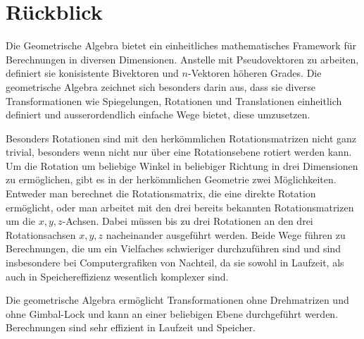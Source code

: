 \section{Rückblick}
Die Geometrische Algebra bietet ein einheitliches mathematisches Framework für Berechnungen
in diversen Dimensionen. Anstelle mit Pseudovektoren zu arbeiten, definiert sie konisistente
Bivektoren und $n$-Vektoren höheren Grades. Die geometrische Algebra zeichnet sich besonders
darin aus, dass sie diverse Transformationen wie Spiegelungen, Rotationen und Translationen
einheitlich definiert und ausserordendlich einfache Wege bietet, diese umzusetzen.

Besonders Rotationen sind mit den herkömmlichen Rotationsmatrizen nicht ganz trivial, besonders wenn
nicht nur über eine Rotationsebene rotiert werden kann. Um die Rotation um beliebige Winkel in beliebiger
Richtung in drei Dimensionen zu ermöglichen, gibt es in der herkömmlichen Geometrie zwei Möglichkeiten. Entweder
man berechnet die Rotationsmatrix, die eine direkte Rotation ermöglicht, oder man arbeitet mit den drei bereits bekannten
Rotationsmatrizen um die $x, y, z$-Achsen. Dabei müssen bis zu drei
Rotationen an den drei Rotationsachsen $x, y, z$ nacheinander ausgeführt werden.
Beide Wege führen zu Berechnungen, die um ein Vielfaches
schwieriger durchzuführen sind und sind insbesondere bei Computergrafiken von Nachteil, da sie sowohl in Laufzeit,
als auch in Speichereffizienz wesentlich komplexer sind.

Die geometrische Algebra ermöglicht Transformationen ohne Drehmatrizen und ohne Gimbal-Lock und kann an einer beliebigen
Ebene durchgeführt werden. Berechnungen sind sehr effizient in Laufzeit und Speicher.
